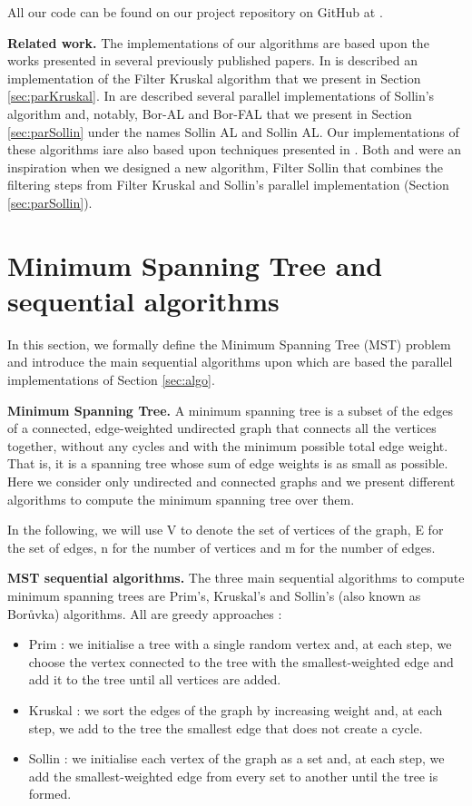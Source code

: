 \documentclass[letterpaper]{article}
\newcommand{\mypar}[1]{{\bf #1.}}
\begin{document}
All our code can be found on our project repository on GitHub at \cite{code}.

\mypar{Related work} The implementations of our algorithms are based upon the works presented in several previously published papers.
In \cite{kruskal} is described an implementation of the Filter Kruskal algorithm that we present in Section \ref{sec:parKruskal}.
In \cite{sollin} are described several parallel implementations of Sollin's algorithm and, notably, Bor-AL and Bor-FAL that we present in Section \ref{sec:parSollin} under the names Sollin AL and Sollin AL. Our implementations of these algorithms iare also based upon techniques presented in \cite{pointerJump}. Both \cite{kruskal} and \cite{sollin} were an inspiration when we designed a new algorithm, Filter Sollin that combines the filtering steps from Filter Kruskal and Sollin's parallel implementation (Section \ref{sec:parSollin}).


\section{Minimum Spanning Tree and sequential algorithms}\label{sec:background}

In this section, we formally define the Minimum Spanning Tree (MST) problem and introduce the main sequential algorithms upon which are based the parallel implementations of Section \ref{sec:algo}.

\mypar{Minimum Spanning Tree}
A minimum spanning tree is a subset of the edges of a connected, edge-weighted undirected graph that connects all the vertices together, without any cycles and with the minimum possible total edge weight.
That is, it is a spanning tree whose sum of edge weights is as small as possible. 
Here we consider only undirected and connected graphs and we present different algorithms to compute the minimum spanning tree over them. 

In the following, we will use V to denote the set of vertices of the graph, E for the set of edges, n for the number of vertices and m for the number of edges.

\mypar{MST sequential algorithms} The three main sequential algorithms to compute minimum spanning trees are Prim's, Kruskal's and Sollin's (also known as Bor\r{u}vka)  algorithms. All are greedy approaches :
\begin{itemize}
    \item Prim : we initialise a tree with a single random vertex and, at each step, we choose the vertex connected to the tree with the smallest-weighted edge and add it to the tree until all vertices are added.
    \item Kruskal : we sort the edges of the graph by increasing weight and, at each step, we add to the tree the smallest edge that does not create a cycle.
    \item Sollin : we initialise each vertex of the graph as a set and, at each step, we add the smallest-weighted edge from every set to another until the tree is formed.
\end{itemize}
\end{document}

